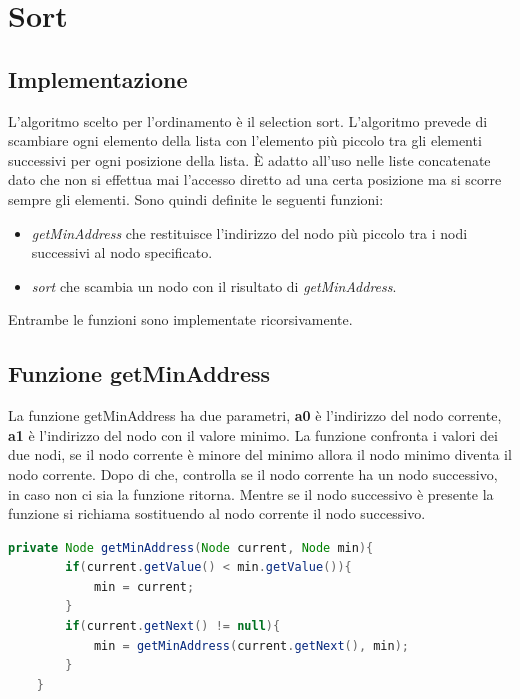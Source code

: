 \section{Sort}

\subsection{Implementazione}
L'algoritmo scelto per l'ordinamento è il selection sort. L'algoritmo prevede di scambiare 
ogni elemento della lista con l'elemento più piccolo tra gli elementi successivi per ogni 
posizione della lista. È adatto all'uso nelle liste concatenate dato che non si effettua 
mai l'accesso diretto ad una certa posizione ma si scorre sempre gli elementi. 
Sono quindi definite le seguenti funzioni:

\begin{itemize}
    \item \textit{getMinAddress} che restituisce l'indirizzo del nodo più piccolo tra i nodi successivi
    al nodo specificato. 
    \item \textit{sort} che scambia un nodo con il risultato di \textit{getMinAddress}.
\end{itemize}
Entrambe le funzioni sono implementate ricorsivamente.
\subsection{Funzione getMinAddress}
La funzione getMinAddress ha due parametri, 
\textbf{a0} è l'indirizzo del nodo corrente, \textbf{a1} è l'indirizzo del nodo con il valore minimo.
La funzione confronta i valori dei due nodi, se il nodo corrente è minore del minimo allora il nodo minimo diventa il nodo corrente.
Dopo di che, controlla se il nodo corrente ha un nodo successivo, in caso non ci sia la funzione ritorna. Mentre se il nodo successivo è presente
la funzione si richiama sostituendo al nodo corrente il nodo successivo.
\\

\begin{lstlisting}[language=java,caption={Codice java algoritmo getMinAddress},captionpos=b] 
    private Node getMinAddress(Node current, Node min){
        if(current.getValue() < min.getValue()){
            min = current;
        }
        if(current.getNext() != null){
            min = getMinAddress(current.getNext(), min);
        }
    }
\end{lstlisting}

